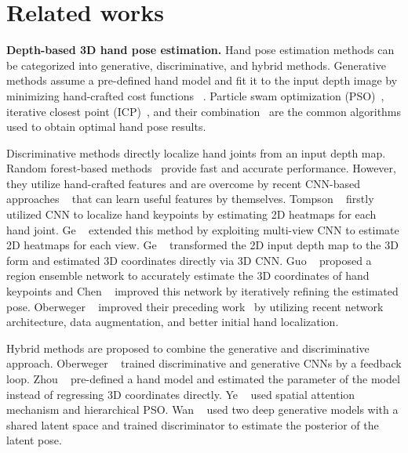 \documentclass[10pt,twocolumn,letterpaper]{article}
\begin{document}
\section{Related works}

{\bf Depth-based 3D hand pose estimation.} 
Hand pose estimation methods can be categorized into generative, discriminative, and hybrid methods. Generative methods assume a pre-defined hand model and fit it to the input depth image by minimizing hand-crafted cost functions ~\cite{sharp2015accurate, tang2015opening}. Particle swam optimization (PSO)~\cite{sharp2015accurate}, iterative closest point (ICP)~\cite{tagliasacchi2015robust}, and their combination~\cite{qian2014realtime} are the common algorithms used to obtain optimal hand pose results.

Discriminative methods directly localize hand joints from an input depth map. Random forest-based methods~\cite{keskin2012hand,tang2013real,tang2014latent,liang2014parsing,sun2015cascaded,tang2015opening,wan2016hand} provide fast and accurate performance. However, they utilize hand-crafted features and are overcome by recent CNN-based approaches ~\cite{tompson2014real,oberweger2015hands,ge2016robust,sinha2016deephand,bouchacourt2016disco,yang2016hand,deng2017hand3d,ge20173d,guo2017ren,guo2017towards,chen2017pose,madadi2017end,fourure2017multi,xu2017lie,Choi_2017_ICCV,Oberweger_2017_ICCV_Workshops} that can learn useful features by themselves. Tompson \etal~\cite{tompson2014real} firstly utilized CNN to localize hand keypoints by estimating 2D heatmaps for each hand joint. Ge \etal~\cite{ge2016robust} extended this method by exploiting multi-view CNN to estimate 2D heatmaps for each view. Ge \etal~\cite{ge20173d} transformed the 2D input depth map to the 3D form and estimated 3D coordinates directly via 3D CNN. Guo \etal~\cite{guo2017ren,guo2017towards} proposed a region ensemble network to accurately estimate the 3D coordinates of hand keypoints and Chen \etal~\cite{chen2017pose} improved this network by iteratively refining the estimated pose. Oberweger \etal~\cite{Oberweger_2017_ICCV_Workshops} improved their preceding work~\cite{oberweger2015hands} by utilizing recent network architecture, data augmentation, and better initial hand localization.

Hybrid methods are proposed to combine the generative and discriminative approach. Oberweger \etal~\cite{oberweger2015training} trained discriminative and generative CNNs by a feedback loop. Zhou \etal~\cite{zhou2016model} pre-defined a hand model and estimated the parameter of the model instead of regressing 3D coordinates directly. Ye \etal~\cite{ye2016spatial} used spatial attention mechanism and hierarchical PSO. Wan \etal~\cite{Wan_2017_CVPR} used two deep generative models with a shared latent space and trained discriminator to estimate the posterior of the latent pose.
\end{document}
